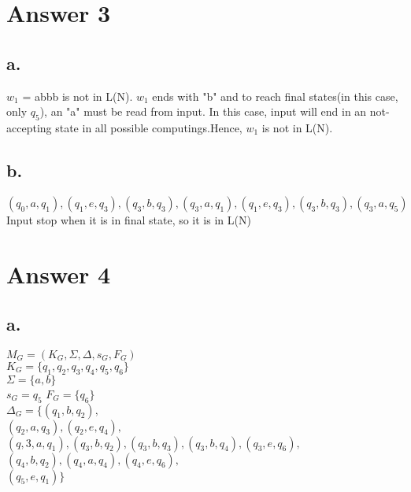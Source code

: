 \documentclass[12pt]{article}
\begin{document}
\section*{Answer 3}


\subsection*{a.}

$w_1$ = abbb is not in L(N). $w_1$ ends with "b" and to reach final states(in this case, only $q_5$), an "a" must be read from input. In this case, input will end in an not-accepting state in all possible computings.Hence, $w_1$ is not in L(N).\\
\subsection*{b.}
 $(q_0,a,q_1),(q_1,e,q_3),(q_3,b,q_3),(q_3,a,q_1),(q_1,e,q_3),(q_3,b,q_3),(q_3,a,q_5)$\\
Input stop when it is in final state, so it is in L(N) \\



\section*{Answer 4}

\subsection*{a.}
$M_G = (K_G,\Sigma,\Delta,s_G,F_G)$\\
$K_G = \{q_1,q_2,q_3,q_4,q_5,q_6\}$\\
$\Sigma = \{a,b\}$\\
$s_G = q_5$ $F_G = \{ q_6\}$\\
$\Delta_G = \{(q_1,b,q_2),$\\

$(q_2,a,q_3),(q_2,e,q_4),$\\

$(q,3,a,q_1),(q_3,b,q_2),(q_3,b,q_3),(q_3,b,q_4),(q_3,e,q_6),$\\

$(q_4,b,q_2),(q_4,a,q_4),(q_4,e,q_6),$\\

$(q_5,e,q_1)\}$\\
\end{document}
